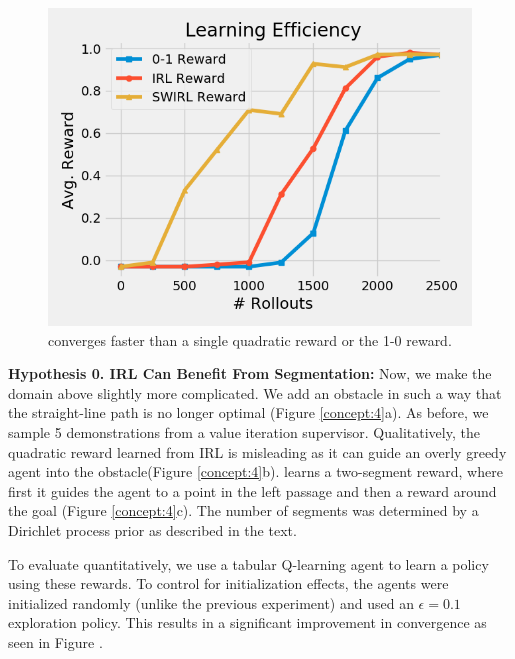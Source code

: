 \begin{figure}[t]
\centering
 \includegraphics[width=0.6\columnwidth]{concept/2-1.png}
 \caption{\hirl converges faster than a single quadratic reward or the 1-0 reward. \label{concept:5}}
\end{figure}


\vspace{0.5em} \noindent \textbf{Hypothesis 0. IRL Can Benefit From Segmentation: } Now, we make the domain above slightly more complicated. We add an obstacle in such a way that the straight-line path is no longer optimal (Figure \ref{concept:4}a). As before, we sample 5 demonstrations from a value iteration supervisor.
Qualitatively, the quadratic reward learned from IRL is misleading as it can guide an overly greedy agent into the obstacle(Figure \ref{concept:4}b). 
\hirl learns a two-segment reward, where first it guides the agent to a point in the left passage and then a reward around the goal (Figure \ref{concept:4}c).
The number of segments was determined by a Dirichlet process prior as described in the text.

To evaluate \hirl quantitatively, we use a tabular Q-learning agent to learn a policy using these rewards.
To control for initialization effects, the agents were initialized randomly (unlike the previous experiment) and used an $\epsilon=0.1$ exploration policy.
This results in a significant improvement in convergence as seen in Figure \label{concept:5}.

